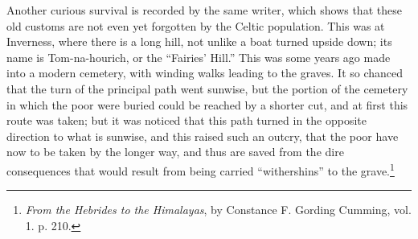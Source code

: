 \documentclass[a4paper, 11pt, oneside, polutonikogreek, english]{article}
\begin{document}
Another curious survival is recorded by the same writer, which shows that these old customs are not even yet forgotten by the Celtic population. This was at Inverness, where there is a long hill, not unlike a boat turned upside down; its name is Tom-na-hourich, or the ``Fairies' Hill.'' This was some years ago made into a modern cemetery, with winding walks leading to the graves. It so chanced that the turn of the principal path went sunwise, but the portion of the cemetery in which the poor were buried could be reached by a shorter cut, and at first this route was taken; but it was noticed that this path turned in the opposite direction to what is sunwise, and this raised such an outcry, that the poor have now to be taken by the longer way, and thus are saved from the dire consequences that would result from being carried ``withershins'' to the grave.\footnote{\emph{From the Hebrides to the Himalayas}, by Constance F. Gording Cumming, vol. 1. p. 210.}
\end{document}
